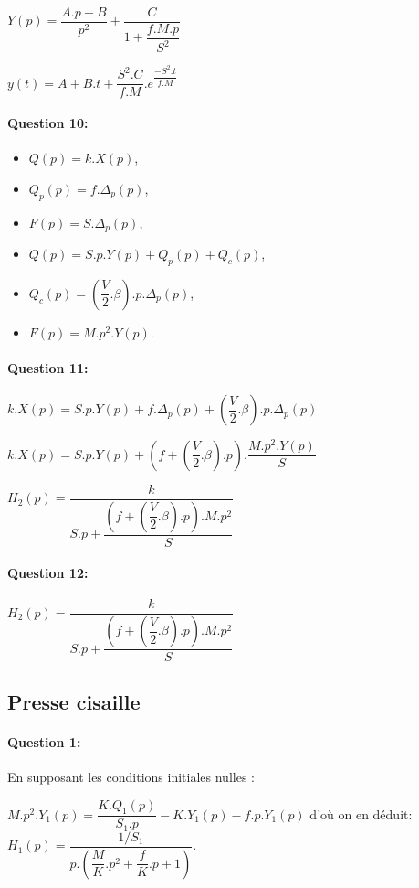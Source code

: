 $Y(p)=\dfrac{A.p+B}{p^2}+\dfrac{C}{1+\dfrac{f.M.p}{S^2}}$

$y(t)=A+B.t+\dfrac{S^2.C}{f.M}.e^{\dfrac{-S^2.t}{f.M}}$

\paragraph{Question 10:}

\begin{itemize}
 \item $Q(p)=k.X(p)$,
 \item $Q_p(p)=f.\Delta_p(p)$,
 \item $F(p)=S.\Delta_p(p)$,
 \item $Q(p)=S.p.Y(p)+Q_p(p)+Q_c(p)$,
 \item $Q_c(p)=\left(\dfrac{V}{2}.\beta\right).p.\Delta_p(p)$,
 \item $F(p)=M.p^2.Y(p)$.
\end{itemize}

\paragraph{Question 11:}

$k.X(p)=S.p.Y(p)+f.\Delta_p(p)+\left(\dfrac{V}{2}.\beta\right).p.\Delta_p(p)$

$k.X(p)=S.p.Y(p)+\left(f+\left(\dfrac{V}{2}.\beta\right).p\right).\dfrac{M.p^2.Y(p)}{S}$

$H_2(p)=\dfrac{k}{S.p+\dfrac{\left(f+\left(\dfrac{V}{2}.\beta\right).p\right).M.p^2}{S}}$

\paragraph{Question 12:}

$H_2(p)=\dfrac{k}{S.p+\dfrac{\left(f+\left(\dfrac{V}{2}.\beta\right).p\right).M.p^2}{S}}$

\subsection{Presse cisaille}

\paragraph{Question 1:}

En supposant les conditions initiales nulles :

$M.p^2.Y_1(p)=\dfrac{K.Q_1(p)}{S_1.p}-K.Y_1(p)-f.p.Y_1(p)$ d'où on en déduit: $H_1(p)=\dfrac{1/S_1}{p.\left(\dfrac{M}{K}.p^2+\dfrac{f}{K}.p+1\right)}$.

